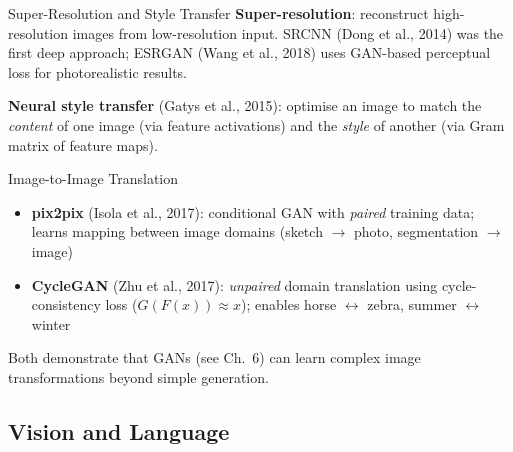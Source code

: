 \begin{v3topic}{Super-Resolution and Style Transfer}
    \textbf{Super-resolution}: reconstruct high-resolution images from low-resolution input.
    SRCNN (Dong et al., 2014) was the first deep approach; ESRGAN (Wang et al., 2018) uses GAN-based perceptual loss for photorealistic results.

    \textbf{Neural style transfer} (Gatys et al., 2015): optimise an image to match the \emph{content} of one image (via feature activations) and the \emph{style} of another (via Gram matrix of feature maps).

\end{v3topic}
\begin{v3topic}{Image-to-Image Translation}
    \begin{itemize}
        \item \textbf{pix2pix} (Isola et al., 2017): conditional GAN with \emph{paired} training data; learns mapping between image domains (sketch $\to$ photo, segmentation $\to$ image)
        \item \textbf{CycleGAN} (Zhu et al., 2017): \emph{unpaired} domain translation using cycle-consistency loss ($G(F(x)) \approx x$); enables horse $\leftrightarrow$ zebra, summer $\leftrightarrow$ winter
    \end{itemize}
    Both demonstrate that GANs (see Ch.~6) can learn complex image transformations beyond simple generation.
\end{v3topic}

\subsection{Vision and Language}

